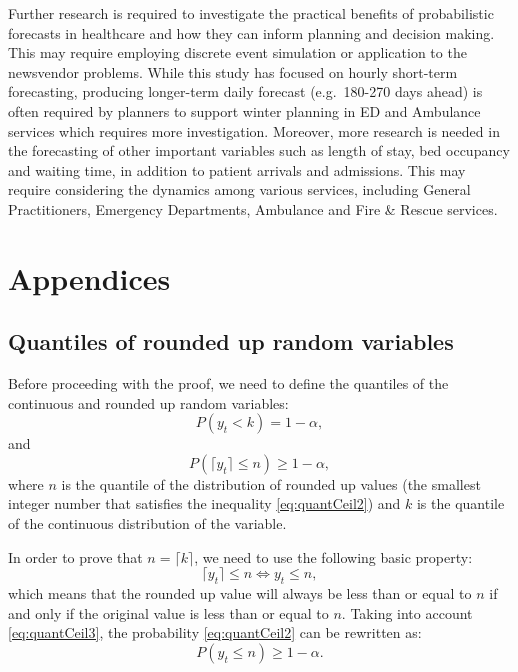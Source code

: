 \documentclass[]{elsarticle} %
\begin{document}
Further research is required to investigate the practical benefits of
probabilistic forecasts in healthcare and how they can inform planning
and decision making. This may require employing discrete event simulation or
application to the newsvendor problems. While this study has focused on
hourly short-term forecasting, producing longer-term daily forecast
(e.g.~180-270 days ahead) is often required by planners to support
winter planning in ED and Ambulance services which requires more
investigation. Moreover, more research is needed in the forecasting of
other important variables such as length of stay, bed occupancy and
waiting time, in addition to patient arrivals and admissions. This may
require considering the dynamics among various services, including
General Practitioners, Emergency Departments, Ambulance and Fire \&
Rescue services.

\hypertarget{appendices}{%
\section{Appendices}\label{appendices}}

\hypertarget{quantilesceiling}{%
\subsection{Quantiles of rounded up random variables}\label{quantilesceiling}}

Before proceeding with the proof, we need to define the quantiles of the
continuous and rounded up random variables:
\begin{equation} \label{eq:quantCeil1}
    P \left(y_t < k \right) = 1 - \alpha ,
\end{equation} and \begin{equation} \label{eq:quantCeil2}
    P \left(\lceil y_t \rceil \leq n \right) \geq 1 - \alpha ,
\end{equation} where \(n\) is the quantile of the distribution of rounded
up values (the smallest integer number that satisfies the inequality
\eqref{eq:quantCeil2}) and \(k\) is the quantile of the continuous
distribution of the variable.

In order to prove that \(n = \lceil k \rceil\), we need to use the
following basic property: \begin{equation} \label{eq:quantCeil3}
    \lceil y_t \rceil \leq n \iff  y_t \leq n,
\end{equation} which means that the rounded up value will always be less
than or equal to \(n\) if and only if the original value is less than or
equal to \(n\). Taking into account \eqref{eq:quantCeil3}, the probability
\eqref{eq:quantCeil2} can be rewritten as:
\begin{equation} \label{eq:quantCeil4}
    P \left(y_t \leq n \right) \geq 1 - \alpha .
\end{equation}
\end{document}
